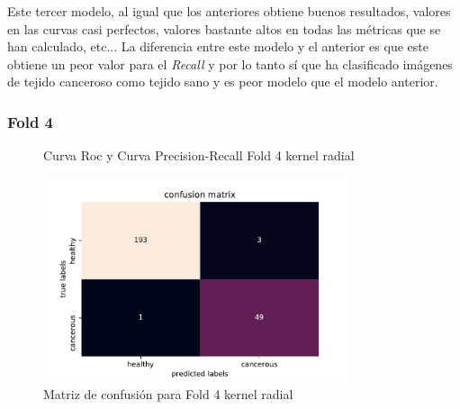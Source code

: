 Este tercer modelo, al igual que los anteriores obtiene buenos resultados, valores en las curvas casi perfectos, valores bastante altos en todas las métricas que se han calculado, etc... La diferencia entre este modelo y el anterior es que este obtiene un peor valor para el \textit{Recall} y por lo tanto sí que ha clasificado imágenes de tejido canceroso como tejido sano y es peor modelo que el modelo anterior.

\subsubsection{Fold 4}

\begin{figure}[H]
	\centering
	\caption{Curva Roc y Curva Precision-Recall Fold 4 kernel radial}
	\label{fig:resultados4}
\end{figure}

\begin{figure}[H]
	\centering
	\includegraphics[width=90mm]{imagenes/confusion_mat4_gpflow}
	\caption{Matriz de confusión para Fold 4 kernel radial}
	\label{fig:conf4}
\end{figure}

